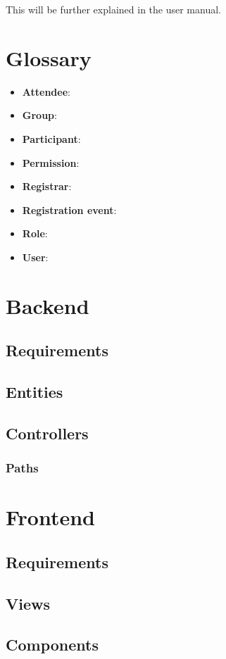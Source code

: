 \documentclass[12pt, letterpaper]{report}
\newcommand{\bolditem}[1]{\item \textbf{#1}}
\begin{document}
This will be further explained in the user manual.

\chapter{Glossary}

\begin{itemize}
    \bolditem{Attendee}:
    \bolditem{Group}:
    \bolditem{Participant}:
    \bolditem{Permission}:
    \bolditem{Registrar}:
    \bolditem{Registration event}:
    \bolditem{Role}:
    \bolditem{User}:
\end{itemize}

\chapter{Backend}

\section{Requirements}

\section{Entities}

\section{Controllers}

\subsection{Paths}

\chapter{Frontend}

\section{Requirements}

\section{Views}

\section{Components}
\end{document}
